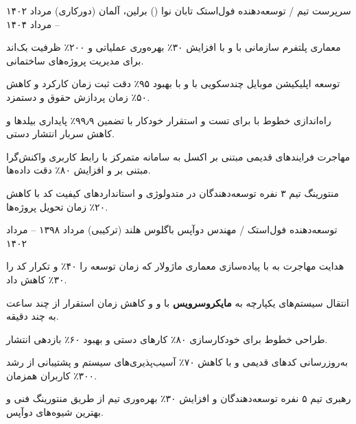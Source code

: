 \begin{cventries}
\cventry
{سرپرست تیم / توسعه‌دهنده فول‌استک} %
{تابان نوا ()} %
{برلین، آلمان (دورکاری)} %
{مرداد ۱۴۰۲ -- مرداد ۱۴۰۴} %
{
	\begin{cvitems}
		\item {معماری پلتفرم سازمانی  با \textbf{} و \textbf{} با افزایش ۳۰٪ بهره‌وری عملیاتی و ۲۰۰٪ ظرفیت بک‌اند برای مدیریت پروژه‌های ساختمانی.}
		\item {توسعه اپلیکیشن موبایل چندسکویی با \textbf{} و \textbf{} با بهبود ۹۵٪ دقت ثبت زمان کارکرد و کاهش ۵۰٪ زمان پردازش حقوق و دستمزد.}
		\item {راه‌اندازی خطوط  با \textbf{} برای تست و استقرار خودکار با تضمین ۹۹٫۹٪ پایداری بیلدها و کاهش سربار انتشار دستی.}
		\item {مهاجرت فرایندهای قدیمی مبتنی بر اکسل به سامانه متمرکز با رابط کاربری واکنش‌گرا مبتنی بر \textbf{} و افزایش ۸۰٪ دقت داده‌ها.}
		\item {منتورینگ تیم ۳ نفره توسعه‌دهندگان در متدولوژی \textbf{} و استانداردهای کیفیت کد با کاهش ۲۰٪ زمان تحویل پروژه‌ها.}
	\end{cvitems}
}

\cventry
{توسعه‌دهنده فول‌استک / مهندس دوآپس} %
{باگلوس} %
{هلند (ترکیبی)} %
{مرداد ۱۳۹۸ -- مرداد ۱۴۰۲} %
{
	\begin{cvitems}
		\item {هدایت مهاجرت به \textbf{} با پیاده‌سازی معماری ماژولار که زمان توسعه را ۴۰٪ و تکرار کد را ۳۰٪ کاهش داد.}
		\item {انتقال سیستم‌های یکپارچه به \textbf{مایکروسرویس} با \textbf{} و \textbf{} و کاهش زمان استقرار از چند ساعت به چند دقیقه.}
		\item {طراحی خطوط \textbf{} برای خودکارسازی ۸۰٪ کارهای دستی و بهبود ۶۰٪ بازدهی انتشار.}
		\item {به‌روزرسانی کدهای قدیمی \textbf{} و \textbf{} با کاهش ۷۰٪ آسیب‌پذیری‌های سیستم و پشتیبانی از رشد ۳۰۰٪ کاربران همزمان.}
		\item {رهبری تیم ۵ نفره توسعه‌دهندگان و افزایش ۳۰٪ بهره‌وری تیم از طریق منتورینگ فنی و بهترین شیوه‌های دوآپس.}
	\end{cvitems}
}


\end{cventries}
